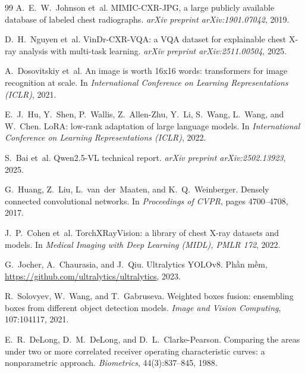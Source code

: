 {\begin{thebibliography}{99}
A.~E.~W.~Johnson et~al.
\newblock MIMIC-CXR-JPG, a large publicly available database of labeled chest radiographs.
\newblock \emph{arXiv preprint arXiv:1901.07042}, 2019.

D.~H.~Nguyen et~al.
\newblock VinDr-CXR-VQA: a VQA dataset for explainable chest X-ray analysis with multi-task learning.
\newblock \emph{arXiv preprint arXiv:2511.00504}, 2025.

A.~Dosovitskiy et~al.
\newblock An image is worth 16x16 words: transformers for image recognition at scale.
\newblock In \emph{International Conference on Learning Representations (ICLR)}, 2021.

E.~J.~Hu, Y.~Shen, P.~Wallis, Z.~Allen-Zhu, Y.~Li, S.~Wang, L.~Wang, and W.~Chen.
\newblock LoRA: low-rank adaptation of large language models.
\newblock In \emph{International Conference on Learning Representations (ICLR)}, 2022.

S.~Bai et~al.
\newblock Qwen2.5-VL technical report.
\newblock \emph{arXiv preprint arXiv:2502.13923}, 2025.

G.~Huang, Z.~Liu, L.~van~der~Maaten, and K.~Q.~Weinberger.
\newblock Densely connected convolutional networks.
\newblock In \emph{Proceedings of CVPR}, pages 4700--4708, 2017.

J.~P.~Cohen et~al.
\newblock TorchXRayVision: a library of chest X-ray datasets and models.
\newblock In \emph{Medical Imaging with Deep Learning (MIDL), PMLR 172}, 2022.

G.~Jocher, A.~Chaurasia, and J.~Qiu.
\newblock Ultralytics YOLOv8.
\newblock Phần mềm, \url{https://github.com/ultralytics/ultralytics}, 2023.

R.~Solovyev, W.~Wang, and T.~Gabruseva.
\newblock Weighted boxes fusion: ensembling boxes from different object detection models.
\newblock \emph{Image and Vision Computing}, 107:104117, 2021.

E.~R.~DeLong, D.~M.~DeLong, and D.~L.~Clarke-Pearson.
\newblock Comparing the areas under two or more correlated receiver operating characteristic curves: a nonparametric approach.
\newblock \emph{Biometrics}, 44(3):837--845, 1988.

\end{thebibliography}
}
